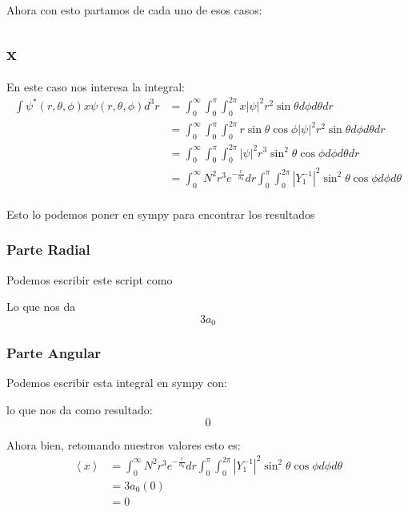 \documentclass{report}
\begin{document}
Ahora con esto partamos de cada uno de esos casos:
\subsection{x}

En este caso nos interesa la integral:
\begin{align*}
	\int \psi^* \left( r, \theta, \phi \right)x \psi \left( r, \theta, \phi \right) d^3r &= \int_0^\infty \int_0^\pi \int_0^{2\pi} x \left| \psi \right|^2 r^2 \sin\theta d\phi d\theta dr\\
	&= \int_0^\infty \int_0^\pi \int_0^{2\pi} r\sin\theta\cos\phi \left| \psi \right|^2 r^2 \sin\theta d\phi d\theta dr\\
	&= \int_0^\infty \int_0^\pi \int_0^{2\pi} \left| \psi \right|^2 r^3 \sin^2\theta\cos\phi d\phi d\theta dr\\
	&= \int_0^\infty N^2 r^3 e^{-\frac{r}{a_0}} dr \int_0^\pi \int_0^{2\pi} \left| Y_1^{-1} \right|^2\sin^2\theta\cos\phi d\phi d\theta\\
\end{align*}

Esto lo podemos poner en sympy para encontrar los resultados

\subsubsection{Parte Radial}

Podemos escribir este script como


Lo que nos da \[
	3 a_{0}
\]

\subsubsection{Parte Angular}

Podemos escribir esta integral en sympy con:


lo que nos da como resultado: \[
	0
\]

Ahora bien, retomando nuestros valores esto es:
\begin{align*}
	\left< x \right> &= \int_0^\infty N^2 r^3 e^{-\frac{r}{a_0}} dr \int_0^\pi \int_0^{2\pi} \left| Y_1^{-1} \right|^2\sin^2\theta\cos\phi d\phi d\theta\\
	&= 3 a_0 \left( 0 \right)\\
	&= 0
\end{align*}
\end{document}
